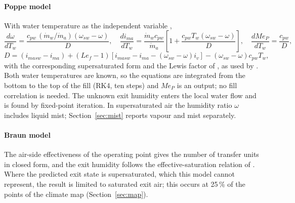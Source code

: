 \documentclass[preprint,12pt,authoryear]{elsarticle}
\begin{document}
\paragraph{Poppe model} With water temperature as the independent variable \citep{kloppers2005critical},
\begin{equation}
\frac{d\omega}{dT_w} = \frac{c_{pw}\,(\dot m_w/\dot m_a)(\omega_{sw}-\omega)}{D},\quad
\frac{di_{ma}}{dT_w} = \frac{\dot m_w c_{pw}}{\dot m_a}\left[1+\frac{c_{pw}T_w(\omega_{sw}-\omega)}{D}\right],\quad
\frac{dMe_P}{dT_w} = \frac{c_{pw}}{D},
\end{equation}
\begin{equation}
D = (i_{masw}-i_{ma}) + (Le_f-1)\left[i_{masw}-i_{ma}-(\omega_{sw}-\omega)i_v\right] - (\omega_{sw}-\omega)c_{pw}T_w,
\end{equation}
with the corresponding supersaturated form and the Lewis factor of \citet{bosnjakovic1965technical}, as used by
\citet{kloppers2005lewis}. Both water temperatures are known, so the equations are integrated from the bottom to the
top of the fill (RK4, ten steps) and $Me_P$ is an output; no fill correlation is needed. The unknown exit humidity enters
the local water flow and is found by fixed-point iteration. In supersaturated air the humidity ratio $\omega$ includes
liquid mist; Section~\ref{sec:mist} reports vapour and mist separately.

\paragraph{Braun model} The air-side effectiveness of the operating point gives the number of transfer units in
closed form, and the exit humidity follows the effective-saturation relation of \citet{braun1989effectiveness}. Where the
predicted exit state is supersaturated, which this model cannot represent, the result is limited to saturated exit air;
this occurs at 25\,\% of the points of the climate map (Section~\ref{sec:map}).
\end{document}
